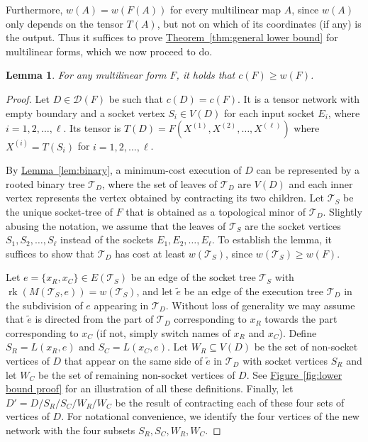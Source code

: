 \documentclass[11pt]{article}
\numberwithin{equation}{section}
\newtheorem{lemma}[theorem]{Lemma}
\theoremstyle{definition}
\theoremstyle{plain}
\newcommand{\expref}[2]{\hyperref[#2]{#1~\ref{#2}}}
\newcommand{\rk}{\ensuremath{\operatorname{rk}}}
\newcommand{\ts}{\ensuremath{\mathcal{T}_S}}
\newcommand{\td}{\ensuremath{\mathcal{T}_D}}
\begin{document}
Furthermore, $w(A) = w(F(A))$ for every multilinear map $A$, since
$w(A)$ only depends on the tensor $T(A)$, but not on which of its coordinates (if any) is the output.
Thus it suffices to prove \expref{Theorem}{thm:general lower bound} for
multilinear forms, which we now proceed to do.

\begin{lemma}
  For any multilinear form $F$, it holds that $c(F) \ge w(F)$.
\end{lemma}

\begin{proof}
  Let $D\in\mathscr{D}(F)$ be such that $c(D)=c(F)$. It is a tensor
  network with empty boundary and a socket vertex $S_i \in V(D)$ for
  each input socket $E_i$, where $i=1,2,\ldots,\ell$. Its tensor is
  $T(D) = F(X^{(1)}, X^{(2)},\ldots, X^{(\ell)})$ where $X^{(i)} =
  T(S_i)$ for $i=1,2,\ldots,\ell$.

  By \expref{Lemma}{lem:binary}, a minimum-cost execution of $D$
  can be represented by a rooted binary tree $\td$,
  where the set of leaves of $\td$ are $V(D)$ and each inner
  vertex represents the vertex obtained by contracting  its two children. Let $\ts$ be the unique socket-tree of $F$ that is obtained as a topological
  minor of $\td$. Slightly abusing the notation, we assume that the leaves of $\ts$ are the socket vertices  $S_1,S_2,\ldots,S_\ell$ instead of the sockets $E_1,E_2,\ldots,E_\ell$.
  To establish the lemma, it suffices to show that
  $\td$ has cost at least $w(\ts)$, since $w(\ts) \geq w(F)$.

  Let $e = \{x_R, x_C\} \in E(\ts)$ be an edge of the socket tree
  $\ts$ with $\rk(M(\ts, e)) = w(\ts)$, and let $\widetilde{e}$ be an edge of
  the execution tree $\td$ in the subdivision of $e$ appearing in
  $\td$. Without loss of generality we may assume that $\widetilde{e}$ is directed from the part of $\td$ corresponding to $x_R$ towards the part corresponding to $x_C$ (if not, simply switch names of $x_R$ and $x_C$).  Define  $S_R = L(x_R, e)$ and
  $S_C = L(x_C, e)$.  Let $W_R \subseteq V(D)$ be the set of
  non-socket vertices of $D$ that appear on the same side of $\widetilde{e}$ in $\td$ with socket vertices $S_R$ and let
  $W_C$ be the set of remaining non-socket vertices of $D$.  See \expref{Figure}{fig:lower bound proof} for an illustration of all these definitions.
  Finally, let $D' = D / S_R / S_C / W_R / W_C$ be the
  result of contracting each of these four sets of vertices of
  $D$.
  For notational convenience, we identify the four vertices of
  the new network with the four subsets $S_R, S_C, W_R, W_C$.


\end{proof}
\end{document}
